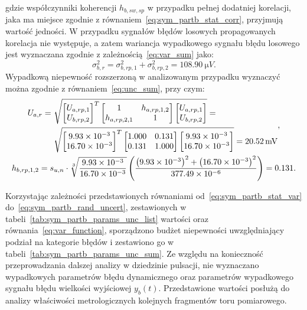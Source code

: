 gdzie współczynniki koherencji $h_{b,sw,sp}$ w przypadku pełnej dodatniej korelacji, jaka ma miejsce zgodnie z równaniem~\eqref{eq:sym_partb_stat_corr}, przyjmują wartość jedności. W przypadku sygnałów błędów losowych propagowanych korelacja nie występuje, a zatem wariancja wypadkowego sygnału błędu losowego jest wyznaczana zgodnie z zależnością~\eqref{eq:var_sum} jako:
\begin{equation}
\sigma_{b,r}^{2} = \sigma_{b,rp,1}^{2} + \sigma_{b,rp,2}^{2} = \qty{108.90}{\micro V} \label{eq:sym_partb_rand_var}.
\end{equation}
Wypadkową niepewność rozszerzoną w analizowanym przypadku wyznaczyć można zgodnie z równaniem~\eqref{eq:unc_sum}, przy czym:
\begin{gather}
\begin{split}
U_{a,r} = ~ & \sqrt{
\begin{bmatrix}
U_{a,rp,1} \\ U_{b,rp,2}
\end{bmatrix}^{T}
\begin{bmatrix}
1            & h_{a,rp,1,2} \\
h_{a,rp,2,1} & 1
\end{bmatrix}
\begin{bmatrix}
U_{a,rp,1} \\ U_{b,rp,2}
\end{bmatrix}} = ~ \\ & \sqrt{
\begin{bmatrix}
\num{9.93e-3} \\ \num{16.70e-3}
\end{bmatrix}^{T}
\begin{bmatrix}
1.000 & 0.131 \\
0.131 & 1.000
\end{bmatrix}
\begin{bmatrix}
\num{9.93e-3} \\ \num{16.70e-3}
\end{bmatrix}} = \qty{20.52}{mV}
\end{split}
\label{eq:sym_partb_rand_uncert}, \\
h_{b,rp,1,2} = s_{u,n} \cdot \sqrt[3]{\frac{\num{9.93e-3}}{\num{16.70e-3}}} \left( \frac{\left(\num{9.93e-3}\right)^{2} + \left(\num{16.70e-3}\right)^{2}}{\num{377.49e-6}} \right) = 0.131 \label{eq:sym_partb_coher_rp_1_2}.
\end{gather}

Korzystając zależności przedstawionych równaniami od~\eqref{eq:sym_partb_stat_var} do~\eqref{eq:sym_partb_rand_uncert}, zestawionych w tabeli~\ref{tab:sym_partb_params_unc_list} wartości oraz równania~\eqref{eq:var_function}, sporządzono budżet niepewności uwzględniający podział na kategorie błędów i zestawiono go w tabeli~\ref{tab:sym_partb_params_unc_sum}. Ze względu na konieczność przeprowadzania dalszej analizy w dziedzinie pulsacji, nie wyznaczano wypadkowych parametrów błędu dynamicznego oraz parametrów wypadkowego sygnału błędu wielkości wyjściowej $y_{b}(t)$. Przedstawione wartości posłużą do analizy właściwości metrologicznych kolejnych fragmentów toru pomiarowego.

